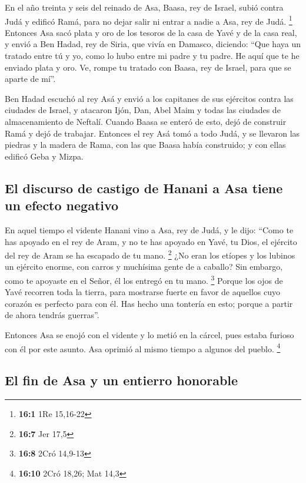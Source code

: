  En el año treinta y seis del reinado de Asa, Baasa, rey
de Israel, subió contra Judá y edificó Ramá, para no dejar salir ni
entrar a nadie a Asa, rey de Judá. \footnote{\textbf{16:1} 1Re 15,16-22}
 Entonces Asa sacó plata y oro de los tesoros de la casa
de Yavé y de la casa real, y envió a Ben Hadad, rey de Siria, que vivía
en Damasco, diciendo:  ``Que haya un tratado entre tú y
yo, como lo hubo entre mi padre y tu padre. He aquí que te he enviado
plata y oro. Ve, rompe tu tratado con Baasa, rey de Israel, para que se
aparte de mí''.

 Ben Hadad escuchó al rey Asá y envió a los capitanes de
sus ejércitos contra las ciudades de Israel, y atacaron Ijón, Dan, Abel
Maim y todas las ciudades de almacenamiento de Neftalí. 
Cuando Baasa se enteró de esto, dejó de construir Ramá y dejó de
trabajar.  Entonces el rey Asá tomó a todo Judá, y se
llevaron las piedras y la madera de Rama, con las que Baasa había
construido; y con ellas edificó Geba y Mizpa.

\hypertarget{el-discurso-de-castigo-de-hanani-a-asa-tiene-un-efecto-negativo}{%
\subsection{El discurso de castigo de Hanani a Asa tiene un efecto
negativo}\label{el-discurso-de-castigo-de-hanani-a-asa-tiene-un-efecto-negativo}}

 En aquel tiempo el vidente Hanani vino a Asa, rey de
Judá, y le dijo: ``Como te has apoyado en el rey de Aram, y no te has
apoyado en Yavé, tu Dios, el ejército del rey de Aram se ha escapado de
tu mano. \footnote{\textbf{16:7} Jer 17,5}  ¿No eran los
etíopes y los lubinos un ejército enorme, con carros y muchísima gente
de a caballo? Sin embargo, como te apoyaste en el Señor, él los entregó
en tu mano. \footnote{\textbf{16:8} 2Cró 14,9-13}  Porque
los ojos de Yavé recorren toda la tierra, para mostrarse fuerte en favor
de aquellos cuyo corazón es perfecto para con él. Has hecho una tontería
en esto; porque a partir de ahora tendrás guerras''.

 Entonces Asa se enojó con el vidente y lo metió en la
cárcel, pues estaba furioso con él por este asunto. Asa oprimió al mismo
tiempo a algunos del pueblo. \footnote{\textbf{16:10} 2Cró 18,26; Mat
  14,3}

\hypertarget{el-fin-de-asa-y-un-entierro-honorable}{%
\subsection{El fin de Asa y un entierro
honorable}\label{el-fin-de-asa-y-un-entierro-honorable}}


